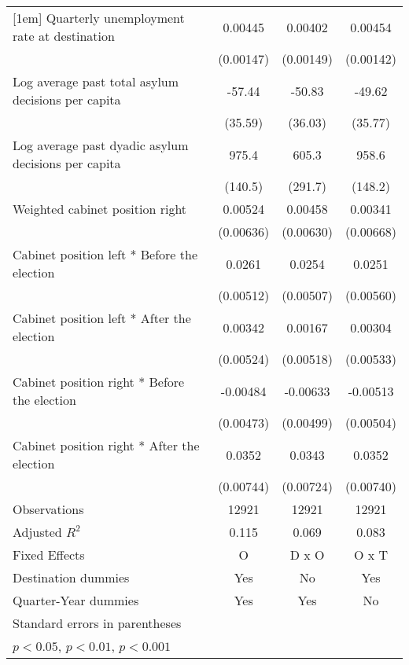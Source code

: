 \begin{table}[htbp]
\begin{tabular}{l*{3}{c}}
[1em]
Quarterly unemployment rate at destination&     0.00445\sym{**} &     0.00402\sym{**} &     0.00454\sym{**} \\
                    &   (0.00147)         &   (0.00149)         &   (0.00142)         \\
[1em]
Log average past total asylum decisions per capita&      -57.44         &      -50.83         &      -49.62         \\
                    &     (35.59)         &     (36.03)         &     (35.77)         \\
[1em]
Log average past dyadic asylum decisions per capita&       975.4\sym{***}&       605.3\sym{*}  &       958.6\sym{***}\\
                    &     (140.5)         &     (291.7)         &     (148.2)         \\
[1em]
Weighted cabinet position right&     0.00524         &     0.00458         &     0.00341         \\
                    &   (0.00636)         &   (0.00630)         &   (0.00668)         \\
[1em]
Cabinet position left * Before the election&      0.0261\sym{***}&      0.0254\sym{***}&      0.0251\sym{***}\\
                    &   (0.00512)         &   (0.00507)         &   (0.00560)         \\
[1em]
Cabinet position left * After the election&     0.00342         &     0.00167         &     0.00304         \\
                    &   (0.00524)         &   (0.00518)         &   (0.00533)         \\
[1em]
Cabinet position right * Before the election&    -0.00484         &    -0.00633         &    -0.00513         \\
                    &   (0.00473)         &   (0.00499)         &   (0.00504)         \\
[1em]
Cabinet position right * After the election&      0.0352\sym{***}&      0.0343\sym{***}&      0.0352\sym{***}\\
                    &   (0.00744)         &   (0.00724)         &   (0.00740)         \\
\hline
Observations        &       12921         &       12921         &       12921         \\
Adjusted \(R^{2}\)  &       0.115         &       0.069         &       0.083         \\
Fixed Effects       &           O         &       D x O         &       O x T         \\
Destination dummies &         Yes         &          No         &         Yes         \\
Quarter-Year dummies&         Yes         &         Yes         &          No         \\
\hline\hline
\multicolumn{4}{l}{\footnotesize Standard errors in parentheses}\\
\multicolumn{4}{l}{\footnotesize \sym{*} \(p<0.05\), \sym{**} \(p<0.01\), \sym{***} \(p<0.001\)}\\
\end{tabular}
\end{table}
